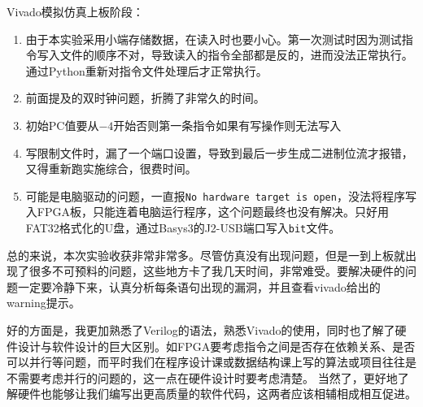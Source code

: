 \documentclass[12pt,UTF8]{ctexart}
\begin{document}
\begin{spacing}{1.1}
\begin{enumerate}
\end{enumerate}
\par Vivado模拟仿真上板阶段：
\begin{enumerate}
    \item 由于本实验采用小端存储数据，在读入时也要小心。第一次测试时因为测试指令写入文件的顺序不对，导致读入的指令全部都是反的，进而没法正常执行。通过Python重新对指令文件处理后才正常执行。
    \item 前面提及的双时钟问题，折腾了非常久的时间。
    \item 初始PC值要从$-4$开始否则第一条指令如果有写操作则无法写入
    \item 写限制文件时，漏了一个端口设置，导致到最后一步生成二进制位流才报错，又得重新跑实施综合，很费时间。
    \item 可能是电脑驱动的问题，一直报\verb'No hardware target is open'，没法将程序写入FPGA板，只能连着电脑运行程序，这个问题最终也没有解决。只好用FAT32格式化的U盘，通过Basys3的J2-USB端口写入\verb'bit'文件。
\end{enumerate}
\par 总的来说，本次实验收获非常非常多。尽管仿真没有出现问题，但是一到上板就出现了很多不可预料的问题，这些地方卡了我几天时间，非常难受。要解决硬件的问题一定要冷静下来，认真分析每条语句出现的漏洞，并且查看vivado给出的warning提示。
\par 好的方面是，我更加熟悉了Verilog的语法，熟悉Vivado的使用，同时也了解了硬件设计与软件设计的巨大区别。如FPGA要考虑指令之间是否存在依赖关系、是否可以并行等问题，而平时我们在程序设计课或数据结构课上写的算法或项目往往是不需要考虑并行的问题的，这一点在硬件设计时要考虑清楚。
当然了，更好地了解硬件也能够让我们编写出更高质量的软件代码，这两者应该相辅相成相互促进。



\end{spacing}
\end{document}
